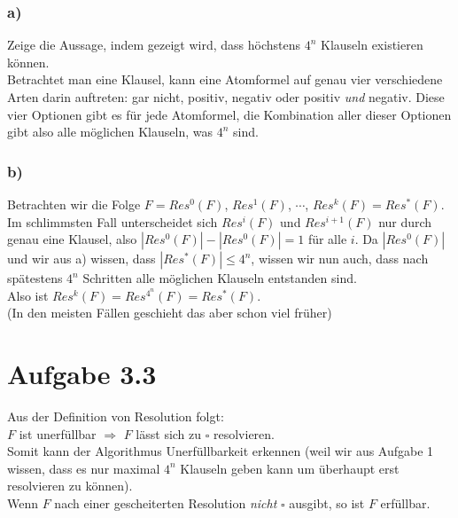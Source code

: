 \documentclass[a4paper,12pt]{article}
\begin{document}
	\subsubsection*{a)}
	Zeige die Aussage, indem gezeigt wird, dass höchstens $4^n$ Klauseln existieren können.\\
	
	Betrachtet man eine Klausel, kann eine Atomformel auf genau vier verschiedene Arten darin auftreten: gar nicht, positiv, negativ oder positiv \textit{und} negativ. Diese vier Optionen gibt es für jede Atomformel, die Kombination aller dieser Optionen gibt also alle möglichen Klauseln, was $4^n$ sind. 
	
	\subsubsection*{b)}
	Betrachten wir die Folge $F = Res^0\left(F\right)$, $Res^1\left(F\right)$, $\cdots$, $Res^k\left(F\right) = Res^*\left(F\right)$.\\
	
	Im schlimmsten Fall unterscheidet sich $Res^i\left(F\right)$ und $Res^{i+1}\left(F\right)$ nur durch genau eine Klausel, also $\left|Res^0\left(F\right)\right| - \left|Res^0\left(F\right)\right| = 1$ für alle $i$. Da $\left|Res^0\left(F\right)\right|$ und wir aus a) wissen, dass $\left|Res^*\left(F\right)\right| \leq 4^n$, wissen wir nun auch, dass nach spätestens $4^n$ Schritten alle möglichen Klauseln entstanden sind.\\
	
	Also ist $Res^k\left(F\right) = Res^{4^n}\left(F\right) = Res^*\left(F\right)$.\\
	(In den meisten Fällen geschieht das aber schon viel früher)
	
	\section*{Aufgabe 3.3}
	Aus der Definition von Resolution folgt:\\
	
	$F$ ist unerfüllbar $\Rightarrow$ $F$ lässt sich zu $\square$ resolvieren.\\
	
	Somit kann der Algorithmus Unerfüllbarkeit erkennen (weil wir aus Aufgabe 1 wissen, dass es nur maximal $4^n$ Klauseln geben kann um überhaupt erst resolvieren zu können).\\
	Wenn $F$ nach einer gescheiterten Resolution \textit{nicht} $\square$ ausgibt, so ist $F$ erfüllbar. 
	
\end{document}
